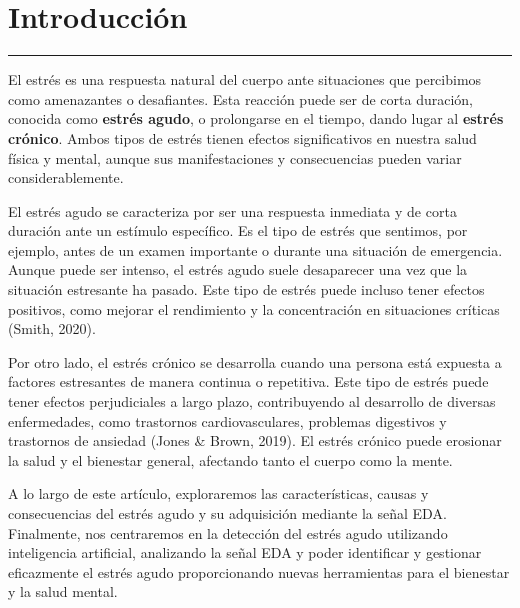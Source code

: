 \chapter{Introducción}
\hrule \bigskip \vspace*{1cm}


El estrés es una respuesta natural del cuerpo ante situaciones que percibimos como amenazantes o desafiantes. Esta reacción puede ser de corta duración, conocida como \textbf{estrés agudo}, o prolongarse en el tiempo, dando lugar al \textbf{estrés crónico}. Ambos tipos de estrés tienen efectos significativos en nuestra salud física y mental, aunque sus manifestaciones y consecuencias pueden variar considerablemente.

El estrés agudo se caracteriza por ser una respuesta inmediata y de corta duración ante un estímulo específico. Es el tipo de estrés que sentimos, por ejemplo, antes de un examen importante o durante una situación de emergencia. Aunque puede ser intenso, el estrés agudo suele desaparecer una vez que la situación estresante ha pasado. Este tipo de estrés puede incluso tener efectos positivos, como mejorar el rendimiento y la concentración en situaciones críticas (Smith, 2020).

Por otro lado, el estrés crónico se desarrolla cuando una persona está expuesta a factores estresantes de manera continua o repetitiva. Este tipo de estrés puede tener efectos perjudiciales a largo plazo, contribuyendo al desarrollo de diversas enfermedades, como trastornos cardiovasculares, problemas digestivos y trastornos de ansiedad (Jones \& Brown, 2019). El estrés crónico puede erosionar la salud y el bienestar general, afectando tanto el cuerpo como la mente.


A lo largo de este artículo, exploraremos  las características, causas y consecuencias del estrés agudo y su adquisición mediante la señal EDA. Finalmente, nos centraremos en la detección del estrés agudo utilizando inteligencia artificial, analizando  la señal EDA  y poder  identificar y gestionar eficazmente el estrés %
agudo proporcionando nuevas herramientas para el bienestar y la salud mental.





